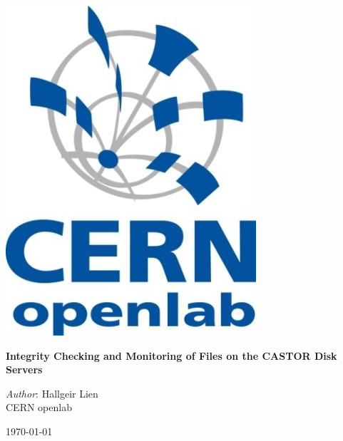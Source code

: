 \thispagestyle{empty}

\begin{minipage}{1\textwidth}
\vspace{4cm}
\end{minipage}

\begin{minipage}{0.4\textwidth}
\begin{flushleft}
\includegraphics[width=\textwidth]{gfx/openlab-logo} 
\end{flushleft}
\end{minipage}
\begin{minipage}{0.6\textwidth}
\begin{flushright}
{\fontsize{30}{30}\selectfont \bf Integrity Checking and Monitoring of Files on the CASTOR Disk Servers}
\end{flushright}
\end{minipage}

\begin{flushright}
\huge
{\it Author}: Hallgeir Lien\\[1cm]
CERN openlab

\dmyyyydate \today

\end{flushright}

\newpage

\setcounter{page}{1}
